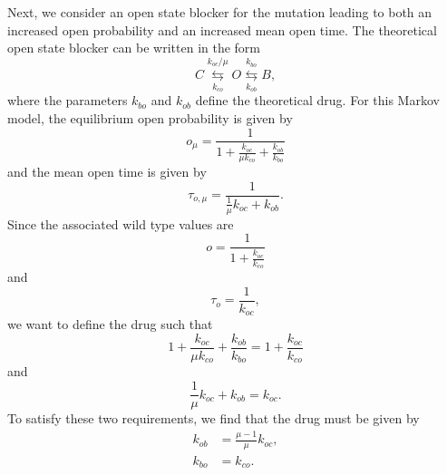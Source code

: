 Next, we consider an open state blocker for the mutation leading to both an
increased open probability and an increased mean open time. The theoretical open 
state blocker can be written in the form
\begin{equation}
C\underset{k_{co}}{\overset{k_{oc}/\mu}{\leftrightarrows}}O\underset{k_{ob}
}{\overset{k_{bo}}{\leftrightarrows}}B, \label{mmob1}
\end{equation}
where the parameters $k_{bo}$ and $k_{ob}$ define the theoretical drug. For this
Markov model, the equilibrium open probability is given by
\[
o_{\mu}=\frac{1}{1+\frac{k_{oc}}{\mu k_{co}}+\frac{k_{ob}}{k_{bo}}}
\]
and the mean open time is given by
\[
\tau_{o,\mu}=\frac{1}{\frac{1}{\mu}k_{oc}+k_{ob}}.
\]
Since the associated wild type values are
\[
o=\frac{1}{1+\frac{k_{oc}}{k_{co}}}
\]
and
\[
\tau_{o}=\frac{1}{k_{oc}},
\]
we want to define the drug such that
\[
1+\frac{k_{oc}}{\mu k_{co}}+\frac{k_{ob}}{k_{bo}}=1+\frac{k_{oc}}{k_{co}}
\]
and
\[
\frac{1}{\mu}k_{oc}+k_{ob}=k_{oc}.
\]
To satisfy these two requirements, we find that the drug must be given by
\begin{equation} \label{mot_o_drg}
\begin{aligned}
k_{ob}  &  =\frac{\mu-1}{\mu}k_{oc},\\
k_{bo}  &  =k_{co}.
\end{aligned}
\end{equation}

